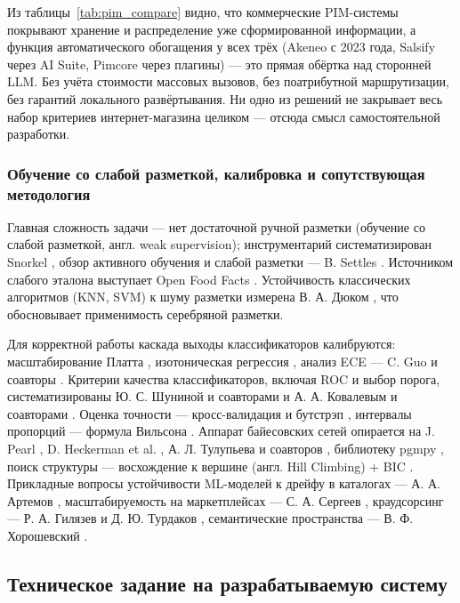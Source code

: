 Из таблицы~\ref{tab:pim_compare} видно, что коммерческие PIM-системы покрывают хранение и распределение уже сформированной информации, а функция автоматического обогащения у всех трёх (Akeneo с 2023 года, Salsify через AI Suite, Pimcore через плагины) — это прямая обёртка над сторонней LLM. Без учёта стоимости массовых вызовов, без поатрибутной маршрутизации, без гарантий локального развёртывания. Ни одно из решений не закрывает весь набор критериев интернет-магазина целиком — отсюда смысл самостоятельной разработки.

\subsubsection{Обучение со слабой разметкой, калибровка и сопутствующая методология}

Главная сложность задачи — нет достаточной ручной разметки (обучение со слабой разметкой, англ. weak supervision); инструментарий систематизирован Snorkel \cite{ref_26}, обзор активного обучения и слабой разметки — B. Settles \cite{ref_46}. Источником слабого эталона выступает Open Food Facts \cite{ref_13}. Устойчивость классических алгоритмов (KNN, SVM) к шуму разметки измерена В. А. Дюком \cite{ref_48}, что обосновывает применимость серебряной разметки.

Для корректной работы каскада выходы классификаторов калибруются: масштабирование Платта \cite{ref_27}, изотоническая регрессия \cite{ref_28}, анализ ECE — C. Guo и соавторы \cite{ref_29}. Критерии качества классификаторов, включая ROC и выбор порога, систематизированы Ю. С. Шуниной и соавторами \cite{ref_49} и А. А. Ковалевым и соавторами \cite{ref_50}. Оценка точности — кросс-валидация и бутстрэп \cite{ref_30}, интервалы пропорций — формула Вильсона \cite{ref_31}. Аппарат байесовских сетей опирается на J. Pearl \cite{ref_32}, D. Heckerman et al. \cite{ref_33}, А. Л. Тулупьева и соавторов \cite{ref_34}, библиотеку pgmpy \cite{ref_35}, поиск структуры — восхождение к вершине (англ. Hill Climbing) + BIC \cite{ref_36}. Прикладные вопросы устойчивости ML-моделей к дрейфу в каталогах — А. А. Артемов \cite{ref_37}, масштабируемость на маркетплейсах — С. А. Сергеев \cite{ref_38}, краудсорсинг — Р. А. Гилязев и Д. Ю. Турдаков \cite{ref_39}, семантические пространства — В. Ф. Хорошевский \cite{ref_40}.

\subsection{Техническое задание на разрабатываемую систему}
\label{subsec:tz}

